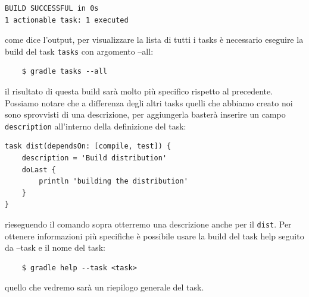 \documentclass{article}
\begin{document}
\begin{flushleft}
\begin{verbatim}
BUILD SUCCESSFUL in 0s
1 actionable task: 1 executed
    \end{verbatim}
    come dice l'output, per visualizzare la lista di tutti i tasks è necessario eseguire la build del task \texttt{tasks} con argomento --all:
    \begin{verbatim}
    $ gradle tasks --all
    \end{verbatim}
    il risultato di questa build sarà molto più specifico rispetto al precedente. Possiamo notare che a differenza degli altri tasks quelli che abbiamo creato noi sono sprovvisti di una descrizione, per aggiungerla basterà inserire un campo \texttt{description} all'interno della definizione del task:
    \begin{verbatim}
task dist(dependsOn: [compile, test]) {
    description = 'Build distribution'
    doLast {
        println 'building the distribution'
    }
}
    \end{verbatim}
    rieseguendo il comando sopra otterremo una descrizione anche per il \texttt{dist}.
    Per ottenere informazioni più specifiche è possibile usare la build del task help seguito da --task e il nome del task:
    \begin{verbatim}
    $ gradle help --task <task>
    \end{verbatim}
    quello che vedremo sarà un riepilogo generale del task.


\end{flushleft}
\end{document}
